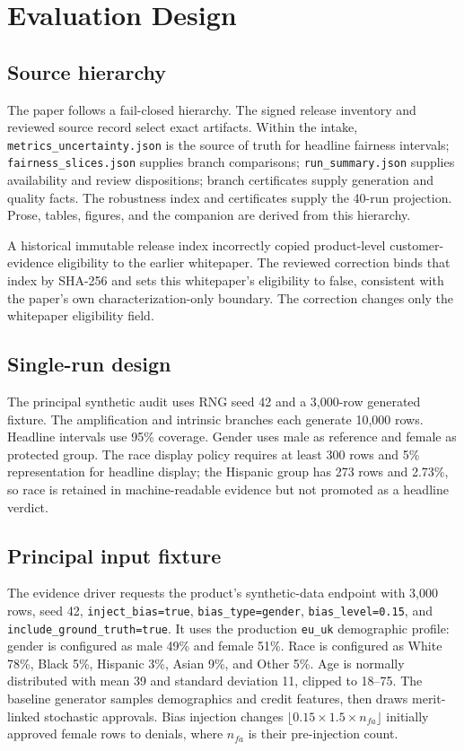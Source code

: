 \section{Evaluation Design}

\subsection{Source hierarchy}

The paper follows a fail-closed hierarchy. The signed release inventory and reviewed source record
select exact artifacts. Within the intake, \texttt{metrics\_uncertainty.json} is the source of truth
for headline fairness intervals; \texttt{fairness\_slices.json} supplies branch comparisons;
\texttt{run\_summary.json} supplies availability and review dispositions; branch certificates
supply generation and quality facts. The robustness index and certificates supply the 40-run
projection. Prose, tables, figures, and the companion are derived from this hierarchy.

A historical immutable release index incorrectly copied product-level customer-evidence eligibility
to the earlier whitepaper. The reviewed correction binds that index by SHA-256 and sets this
whitepaper's eligibility to false, consistent with the paper's own characterization-only boundary.
The correction changes only the whitepaper eligibility field.

\subsection{Single-run design}

The principal synthetic audit uses RNG seed 42 and a 3,000-row generated fixture. The amplification
and intrinsic branches each generate 10,000 rows. Headline intervals use 95\% coverage. Gender uses
male as reference and female as protected group. The race display policy requires at least 300 rows
and 5\% representation for headline display; the Hispanic group has 273 rows and 2.73\%, so race is
retained in machine-readable evidence but not promoted as a headline verdict.

\subsection{Principal input fixture}

The evidence driver requests the product's synthetic-data endpoint with 3,000 rows, seed 42,
\texttt{inject\_bias=true}, \texttt{bias\_type=gender}, \texttt{bias\_level=0.15}, and
\texttt{include\_ground\_truth=true}. It uses the production \texttt{eu\_uk} demographic profile:
gender is configured as male 49\% and female 51\%. Race is configured as White 78\%, Black 5\%,
Hispanic 3\%, Asian 9\%, and Other 5\%. Age is normally distributed with mean 39 and standard
deviation 11, clipped to 18--75. The baseline generator samples
demographics and credit features, then draws merit-linked stochastic approvals. Bias injection
changes $\lfloor 0.15\times1.5\times n_{fa}\rfloor$ initially approved female rows to denials, where
$n_{fa}$ is their pre-injection count.

